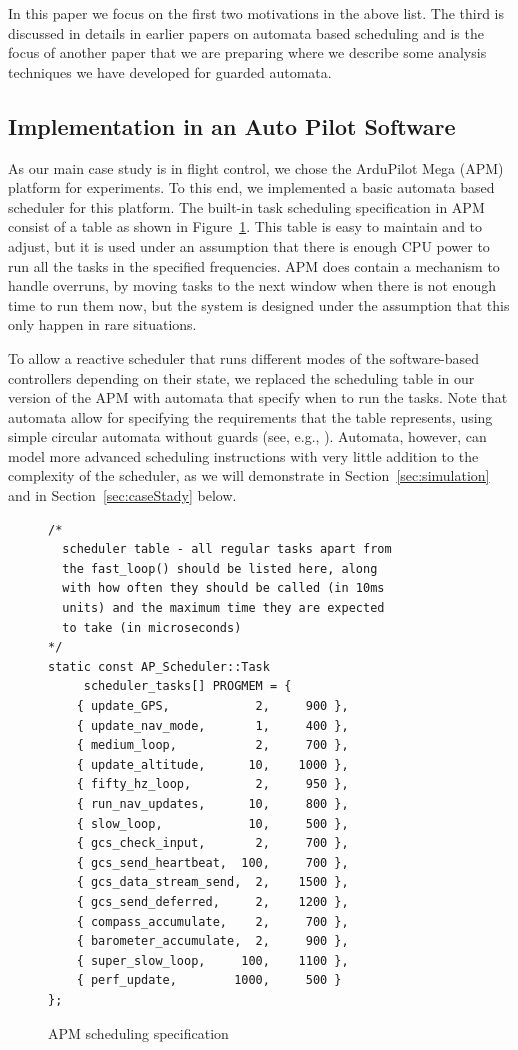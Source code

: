 \documentclass{sig-alternate-ipsn13}
\begin{document}
In this paper we focus on the first two motivations in the above list. The third is discussed in details in earlier papers on automata based scheduling and is the focus of another paper that we are preparing where we describe some analysis techniques we have developed for guarded automata.   

\subsection{Implementation in an Auto Pilot Software}
As our main case study is in flight control, we chose the ArduPilot Mega
(APM) platform for experiments. To this end, we implemented a basic automata based scheduler for this platform. The built-in task scheduling specification in APM consist of a table as shown in Figure~\ref{fig:apm-scheduler}. This table is easy to maintain and to adjust, but it is used under an assumption that there is enough CPU power to run all the tasks in the specified frequencies. APM does contain a mechanism to handle overruns, by moving tasks to the next window when there is not enough time to run them now, but the system is designed under the assumption that this only happen in rare situations.

To allow a reactive scheduler that runs different modes of the software-based controllers depending on their state, we replaced the scheduling table in our version of the APM with automata that specify when to run the tasks. Note that automata allow for specifying the requirements that the table represents, using simple circular automata without guards (see, e.g., \cite{weiss2007automata}). Automata, however, can model more advanced scheduling instructions with very little addition to the complexity of the scheduler, as we will demonstrate in Section~\ref{sec:simulation} and in Section~\ref{sec:caseStady} below.

\begin{figure}
	\scriptsize
	\begin{lstlisting}
/*
  scheduler table - all regular tasks apart from
  the fast_loop() should be listed here, along 
  with how often they should be called (in 10ms 
  units) and the maximum time they are expected 
  to take (in microseconds)
*/
static const AP_Scheduler::Task 
     scheduler_tasks[] PROGMEM = {
	{ update_GPS,            2,     900 },
	{ update_nav_mode,       1,     400 },
	{ medium_loop,           2,     700 },
	{ update_altitude,      10,    1000 },
	{ fifty_hz_loop,         2,     950 },
	{ run_nav_updates,      10,     800 },
	{ slow_loop,            10,     500 },
	{ gcs_check_input,       2,     700 },
	{ gcs_send_heartbeat,  100,     700 },
	{ gcs_data_stream_send,  2,    1500 },
	{ gcs_send_deferred,     2,    1200 },
	{ compass_accumulate,    2,     700 },
	{ barometer_accumulate,  2,     900 },
	{ super_slow_loop,     100,    1100 },
	{ perf_update,        1000,     500 }
};
	\end{lstlisting}
	\caption{APM scheduling specification}
	\label{fig:apm-scheduler} 
\end{figure}
\end{document}
